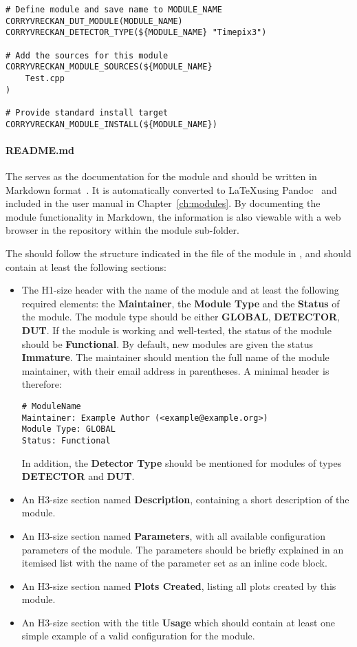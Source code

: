 \begin{verbatim}
# Define module and save name to MODULE_NAME
CORRYVRECKAN_DUT_MODULE(MODULE_NAME)
CORRYVRECKAN_DETECTOR_TYPE(${MODULE_NAME} "Timepix3")

# Add the sources for this module
CORRYVRECKAN_MODULE_SOURCES(${MODULE_NAME}
    Test.cpp
)

# Provide standard install target
CORRYVRECKAN_MODULE_INSTALL(${MODULE_NAME})
\end{verbatim}

\paragraph{README.md}
The  serves as the documentation for the module and should be written in Markdown format~\cite{markdown}.
It is automatically converted to \LaTeX using Pandoc~\cite{pandoc} and included in the user manual in Chapter~\ref{ch:modules}.
By documenting the module functionality in Markdown, the information is also viewable with a web browser in the repository within the module sub-folder.

The  should follow the structure indicated in the  file of the  module in , and should contain at least the following sections:
\begin{itemize}
\item The H1-size header with the name of the module and at least the following required elements: the \textbf{Maintainer}, the \textbf{Module Type} and the \textbf{Status} of the module.
The module type should be either \textbf{GLOBAL}, \textbf{DETECTOR}, \textbf{DUT}.
If the module is working and well-tested, the status of the module should be \textbf{Functional}.
By default, new modules are given the status \textbf{Immature}.
The maintainer should mention the full name of the module maintainer, with their email address in parentheses.
A minimal header is therefore:
\begin{verbatim}
# ModuleName
Maintainer: Example Author (<example@example.org>)
Module Type: GLOBAL
Status: Functional
\end{verbatim}
In addition, the \textbf{Detector Type} should be mentioned for modules of types \textbf{DETECTOR} and \textbf{DUT}.
\item An H3-size section named \textbf{Description}, containing a short description of the module.
\item An H3-size section named \textbf{Parameters}, with all available configuration parameters of the module.
The parameters should be briefly explained in an itemised list with the name of the parameter set as an inline code block.
\item An H3-size section named \textbf{Plots Created}, listing all plots created by this module.
\item An H3-size section with the title \textbf{Usage} which should contain at least one simple example of a valid configuration for the module.
\end{itemize}

